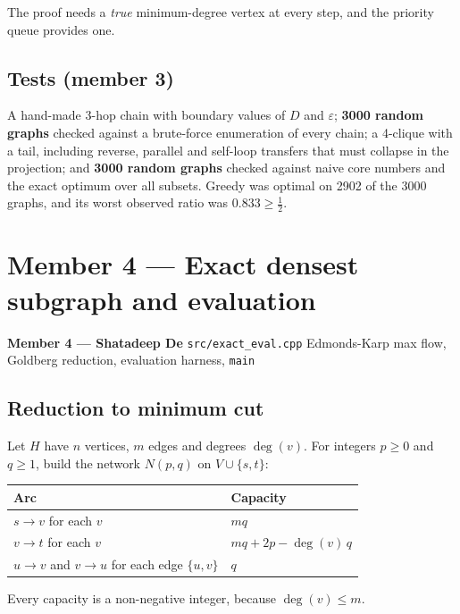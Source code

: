 \documentclass[11pt,a4paper]{article}
\theoremstyle{definition}
\begin{document}
The proof needs a \emph{true} minimum-degree vertex at every step, and the priority queue provides one.

\subsection{Tests (member 3)}
A hand-made 3-hop chain with boundary values of $D$ and $\varepsilon$; \textbf{3000 random graphs} checked against a brute-force enumeration of every chain; a 4-clique with a tail, including reverse, parallel and self-loop transfers that must collapse in the projection; and \textbf{3000 random graphs} checked against naive core numbers and the exact optimum over all subsets. Greedy was optimal on 2902 of the 3000 graphs, and its worst observed ratio was $0.833 \ge \frac{1}{2}$.

\newpage
\section{Member 4 --- Exact densest subgraph and evaluation}

\begin{memberstrip}
\small\textbf{Member 4 --- Shatadeep De} \hfill \texttt{src/exact\_eval.cpp} \quad Edmonds-Karp max flow, Goldberg reduction, evaluation harness, \texttt{main}
\end{memberstrip}

\subsection{Reduction to minimum cut}
Let $H$ have $n$ vertices, $m$ edges and degrees $\deg(v)$. For integers $p \ge 0$ and $q \ge 1$, build the network $N(p, q)$ on $V \cup \{s, t\}$:

\begin{center}
\begin{tabular}{@{}ll@{}}
\toprule
\textbf{Arc} & \textbf{Capacity} \\
\midrule
$s \to v$ for each $v$ & $mq$ \\
$v \to t$ for each $v$ & $mq + 2p - \deg(v)\,q$ \\
$u \to v$ and $v \to u$ for each edge $\{u, v\}$ & $q$ \\
\bottomrule
\end{tabular}
\end{center}

\noindent
Every capacity is a non-negative integer, because $\deg(v) \le m$.
\end{document}
